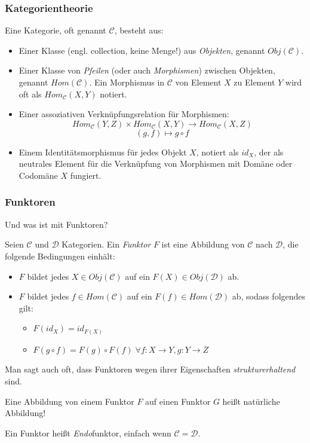 \documentclass{beamer}
\begin{document}

\begin{frame}
\frametitle{Kategorientheorie}

Eine Kategorie, oft genannt $\mathcal{C}$, besteht aus:
\begin{itemize}
\pause\item Einer Klasse (engl. \glqq collection\grqq , keine Menge!) aus \emph{Objekten}, genannt $Obj(\mathcal{C})$.
\pause\item Einer Klasse von \emph{Pfeilen} (oder auch \emph{Morphismen}) zwischen Objekten, genannt $Hom(\mathcal{C})$. Ein Morphismus in $\mathcal{C}$ von Element $X$ zu Element $Y$ wird oft als $Hom_\mathcal{C}(X,Y)$ notiert.
\pause\item Einer assoziativen Verknüpfungsrelation für Morphismen:
$$Hom_\mathcal{C}(Y,Z) \times Hom_\mathcal{C}(X,Y) \to Hom_\mathcal{C}(X,Z)$$
$$(g,f) \mapsto g \circ f$$
\pause\item Einem Identitätsmorphismus für jedes Objekt $X$, notiert als $id_X$, der als neutrales Element für die Verknüpfung von Morphismen mit Domäne oder Codomäne $X$ fungiert.
\end{itemize}
\end{frame}


\begin{frame}
\frametitle{Funktoren}
Und was ist mit Funktoren?\pause\bigskip

Seien $\mathcal{C}$ und $\mathcal{D}$ Kategorien. Ein \emph{Funktor} $F$ ist eine Abbildung
von $\mathcal{C}$ nach $\mathcal{D}$, die folgende Bedingungen einhält:

\begin{itemize}
\pause \item $F$ bildet jedes $X \in Obj(\mathcal{C})$ auf ein $F(X) \in Obj(\mathcal{D})$ ab.
\pause \item $F$ bildet jedes $f \in Hom(\mathcal{C})$ auf ein $F(f) \in Hom(\mathcal{D})$ ab, sodass folgendes gilt:
\begin{itemize}
\pause \item $F(id_X) = id_{F(X)}$
\pause \item $F(g \circ f) = F(g) \circ F(f) \; \forall f: X \to Y, g : Y \to Z$
\end{itemize}
\end{itemize}
\pause\bigskip

Man sagt auch oft, dass Funktoren wegen ihrer Eigenschaften \emph{strukturerhaltend} sind.\pause\smallskip

Eine Abbildung von einem Funktor $F$ auf einen Funktor $G$ heißt \glqq natürliche Abbildung\grqq !
\pause\smallskip

Ein Funktor heißt \emph{Endo}funktor, einfach wenn $\mathcal{C} = \mathcal{D}$.

\end{frame}
\end{document}
